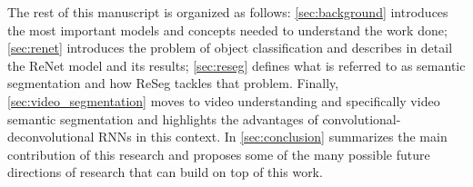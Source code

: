 
The rest of this manuscript is organized as follows: \autoref{sec:background}
introduces the most important models and concepts needed to understand the work
done; \autoref{sec:renet} introduces the problem of object classification and
describes in detail the ReNet model and its results; \autoref{sec:reseg}
defines what is referred to as semantic segmentation and how ReSeg tackles that
problem. Finally, \autoref{sec:video_segmentation} moves to video understanding
and specifically video semantic segmentation and highlights the advantages of
convolutional-deconvolutional RNNs in this context. In
\autoref{sec:conclusion} summarizes the main contribution of this research and
proposes some of the many possible future directions of research that can build
on top of this work.

